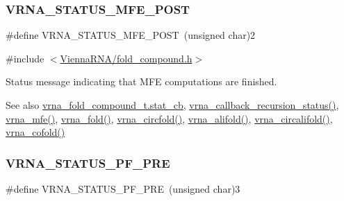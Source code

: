 \subsubsection{\texorpdfstring{V\+R\+N\+A\+\_\+\+S\+T\+A\+T\+U\+S\+\_\+\+M\+F\+E\+\_\+\+P\+O\+ST}{VRNA\_STATUS\_MFE\_POST}}
{\footnotesize\ttfamily \#define V\+R\+N\+A\+\_\+\+S\+T\+A\+T\+U\+S\+\_\+\+M\+F\+E\+\_\+\+P\+O\+ST~(unsigned char)2}



{\ttfamily \#include $<$\hyperlink{fold__compound_8h}{Vienna\+R\+N\+A/fold\+\_\+compound.\+h}$>$}



Status message indicating that M\+FE computations are finished. 

\begin{DoxySeeAlso}{See also}
\hyperlink{group__fold__compound_a87a83f6795b569000efcbe65acc3dd81}{vrna\+\_\+fold\+\_\+compound\+\_\+t.\+stat\+\_\+cb}, \hyperlink{group__fold__compound_gac86036fa8cad1108832335063243cdc8}{vrna\+\_\+callback\+\_\+recursion\+\_\+status()}, \hyperlink{group__mfe__global_gabd3b147371ccf25c577f88bbbaf159fd}{vrna\+\_\+mfe()}, \hyperlink{group__mfe__global_ga29a33b2895f4e67b0480271ff289afdc}{vrna\+\_\+fold()}, \hyperlink{group__mfe__global_gaf973483d8acbc8cc9aacfc8a9b7f0074}{vrna\+\_\+circfold()}, \hyperlink{group__mfe__global_ga6c9d3bef3e92c6d423ffac9f981418c1}{vrna\+\_\+alifold()}, \hyperlink{group__mfe__global_ga17a1be7490468c29c335ba9bffacba53}{vrna\+\_\+circalifold()}, \hyperlink{group__mfe__global_ga9ef3a297201dbf838a8daff2b45c0c82}{vrna\+\_\+cofold()} 
\end{DoxySeeAlso}
\mbox{\label{group__fold__compound_ga91795d35ebdb6f32be50459f24b3d114}} 
\subsubsection{\texorpdfstring{V\+R\+N\+A\+\_\+\+S\+T\+A\+T\+U\+S\+\_\+\+P\+F\+\_\+\+P\+RE}{VRNA\_STATUS\_PF\_PRE}}
{\footnotesize\ttfamily \#define V\+R\+N\+A\+\_\+\+S\+T\+A\+T\+U\+S\+\_\+\+P\+F\+\_\+\+P\+RE~(unsigned char)3}



